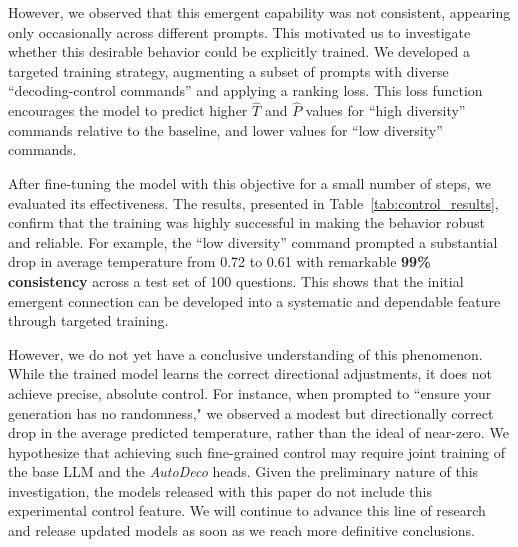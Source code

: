However, we observed that this emergent capability was not consistent, appearing only occasionally across different prompts. This motivated us to investigate whether this desirable behavior could be explicitly trained. We developed a targeted training strategy, augmenting a subset of prompts with diverse ``decoding-control commands'' and applying a ranking loss. This loss function encourages the model to predict higher $\hat{T}$ and $\hat{P}$ values for ``high diversity'' commands relative to the baseline, and lower values for ``low diversity'' commands.

\begin{table}[t!]
\centering
\small
\caption{Quantitative Impact of Diversity Commands \textbf{After Targeted Training} (N=100).}
\label{tab:control_results}
\end{table}

After fine-tuning the model with this objective for a small number of steps, we evaluated its effectiveness. The results, presented in Table~\ref{tab:control_results}, confirm that the training was highly successful in making the behavior robust and reliable. For example, the ``low diversity'' command prompted a substantial drop in average temperature from 0.72 to 0.61 with remarkable \textbf{99\% consistency} across a test set of 100 questions. This shows that the initial emergent connection can be developed into a systematic and dependable feature through targeted training.

However, we do not yet have a conclusive understanding of this phenomenon. While the trained model learns the correct directional adjustments, it does not achieve precise, absolute control. For instance, when prompted to ``ensure your generation has no randomness," we observed a modest but directionally correct drop in the average predicted temperature, rather than the ideal of near-zero. We hypothesize that achieving such fine-grained control may require joint training of the base LLM and the \textit{AutoDeco} heads. Given the preliminary nature of this investigation, the models released with this paper do not include this experimental control feature. We will continue to advance this line of research and release updated models as soon as we reach more definitive conclusions.

